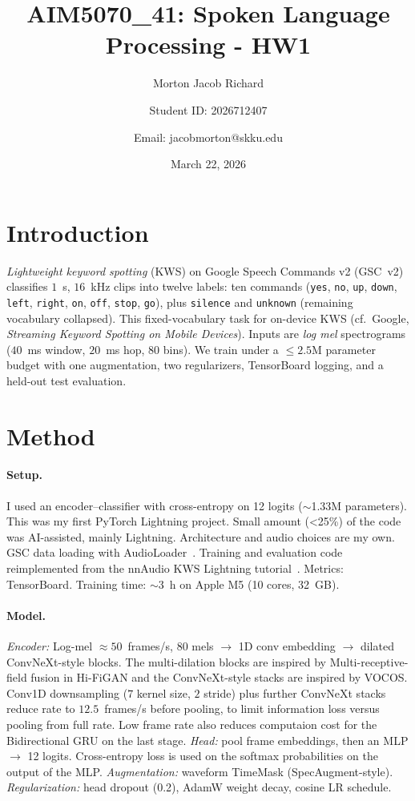 \documentclass[twocolumn,11pt]{article}
\title{AIM5070\_41: Spoken Language Processing - HW1}
\author{Morton Jacob Richard \and Student ID: 2026712407 \and Email: jacobmorton@skku.edu}
\date{March 22, 2026}
\begin{document}
\maketitle

\section{Introduction}

\emph{Lightweight keyword spotting} (KWS) on Google Speech Commands v2 (GSC~v2) classifies $1$~s, $16$~kHz clips into twelve labels: ten commands (\texttt{yes}, \texttt{no}, \texttt{up}, \texttt{down}, \texttt{left}, \texttt{right}, \texttt{on}, \texttt{off}, \texttt{stop}, \texttt{go}), plus \texttt{silence} and \texttt{unknown} (remaining vocabulary collapsed). This fixed-vocabulary task for on-device KWS (cf.\ Google, \emph{Streaming Keyword Spotting on Mobile Devices}). Inputs are \emph{log mel} spectrograms ($40$~ms window, $20$~ms hop, $80$ bins). We train under a $\leq 2.5$M parameter budget with one augmentation, two regularizers, TensorBoard logging, and a held-out test evaluation.

\section{Method}

\paragraph{Setup.}
I used an encoder--classifier with cross-entropy on 12 logits ($\sim$1.33M parameters). This was my first PyTorch Lightning project. Small amount (\textless 25\%) of the code was AI-assisted, mainly Lightning. Architecture and audio choices are my own. GSC data loading with AudioLoader~\cite{audioloader}. Training and evaluation code reimplemented from the nnAudio KWS Lightning tutorial~\cite{nnaudio_tutorial}. Metrics: TensorBoard. Training time: $\sim$3~h on Apple M5 (10 cores, 32~GB).

\paragraph{Model.}
\emph{Encoder:} Log-mel $\approx 50$~frames/s, $80$ mels $\rightarrow$ 1D conv embedding $\rightarrow$ dilated ConvNeXt-style blocks. The multi-dilation blocks are inspired by Multi-receptive-field fusion in Hi-FiGAN and the ConvNeXt-style stacks are inspired by VOCOS. Conv1D downsampling ($7$ kernel size, $2$ stride) plus further ConvNeXt stacks reduce rate to $12.5$~frames/s before pooling, to limit information loss versus pooling from full rate. Low frame rate also reduces computaion cost for the Bidirectional GRU on the last stage. \emph{Head:} pool frame embeddings, then an MLP $\rightarrow$ 12 logits. Cross-entropy loss is used on the softmax probabilities on the output of the MLP. \emph{Augmentation:} waveform TimeMask (SpecAugment-style). \emph{Regularization:} head dropout (0.2), AdamW weight decay, cosine LR schedule.
\end{document}
